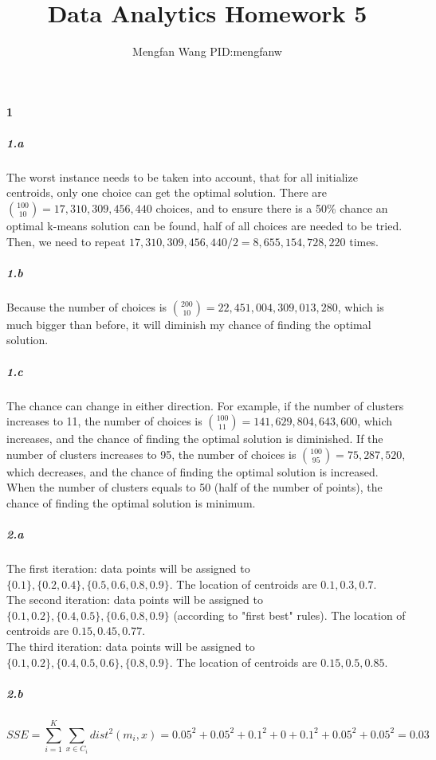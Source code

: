 \documentclass[22pt]{article}
\author{Mengfan Wang PID:mengfanw}
\title{Data Analytics Homework 5}
\begin{document}
	\maketitle 
	\paragraph{1}
		\subparagraph{1.a} The worst instance needs to be taken into account, that for all initialize centroids, only one choice can get the optimal solution. There are $\binom{100}{10} = 17,310,309,456,440$ choices, and to ensure there is a 50\% chance an optimal k-means solution can be found, half of all choices are needed to be tried. Then, we need to repeat $17,310,309,456,440/2 = 8,655,154,728,220$ times.

		\subparagraph{1.b} Because the number of choices is $\binom{200}{10} = 22,451,004,309,013,280$, which is much bigger than before, it will diminish my chance of finding the optimal solution.

		\subparagraph{1.c} The chance can change in either direction. For example, if the number of clusters increases to 11, the number of choices is $\binom{100}{11} = 141,629,804,643,600$, which increases, and the chance of finding the optimal solution is diminished. If the number of clusters increases to 95, the number of choices is $\binom{100}{95} = 75,287,520$, which decreases, and the chance of finding the optimal solution is increased. When the number of clusters equals to 50 (half of the number of points), the chance of finding the optimal solution is minimum. 
 
		\subparagraph{2.a} The first iteration: data points will be assigned to $\{0.1\},\{0.2,0.4\},\{0.5,0.6,0.8,0.9\}$. The location of centroids are $0.1,0.3,0.7$.\\
		The second iteration: data points will be assigned to $\{0.1,0.2\},\{0.4,0.5\},\{0.6,0.8,0.9\}$ (according to "first best" rules). The location of centroids are $0.15,0.45,0.77$.\\
		The third iteration: data points will be assigned to $\{0.1,0.2\},\{0.4,0.5,0.6\},\{0.8,0.9\}$. The location of centroids are $0.15,0.5,0.85$.

		\subparagraph{2.b} 
		\begin{equation}
			SSE = \sum\limits_{i=1}^{K} \sum\limits_{x\in C_i} dist^2(m_i,x) = 0.05^2+0.05^2 + 0.1^2+0+0.1^2 +0.05^2+0.05^2 = 0.03
		\end{equation}
\end{document}
